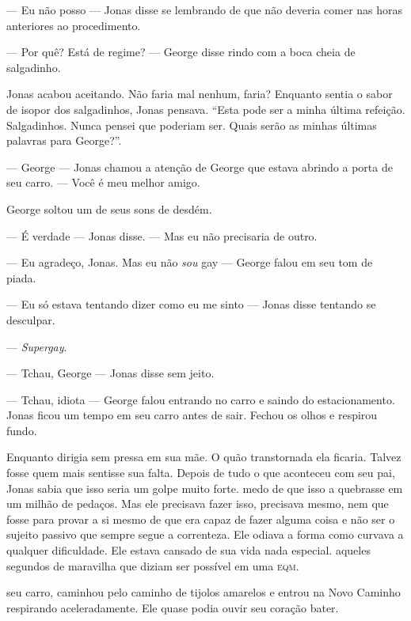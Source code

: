 --- Eu não posso --- Jonas disse\mudanca{,} se lembrando de que não deveria comer nas horas anteriores ao procedimento.

--- Por quê? Está de regime? --- George disse\mudanca{,} rindo\mudanca{,} com a boca cheia de salgadinho.

Jonas acabou aceitando. Não faria mal nenhum, faria? Enquanto sentia o sabor de isopor dos salgadinhos, Jonas pensava. ``Esta pode ser a minha última refeição. Salgadinhos. Nunca pensei que poderiam ser. Quais serão as minhas últimas palavras para George?''.

--- George --- Jonas chamou a atenção de George\mudanca{,} que estava abrindo a porta de seu carro. --- Você é meu melhor amigo.

George soltou um de seus sons de desdém.


--- É verdade --- Jonas disse. --- Mas eu não precisaria de outro.

--- Eu agradeço, Jonas. Mas eu não \emph{sou} gay --- George falou\mudanca{,} em seu tom de piada.

--- Eu só estava tentando dizer como eu me sinto --- Jonas disse\mudanca{,} tentando se desculpar.

--- \emph{Supergay}.

--- Tchau, George --- Jonas disse\mudanca{,} sem jeito.

--- Tchau, idiota --- George falou entrando no carro e saindo do estacionamento. Jonas ficou um tempo em seu carro antes de sair. Fechou os olhos e respirou fundo.

Enquanto dirigia\mudanca{,} sem pressa em sua mãe. O quão transtornada ela ficaria. Talvez fosse quem mais sentisse sua falta. Depois de tudo o que aconteceu com seu pai, Jonas sabia que isso seria um golpe muito forte.  medo de que isso a quebrasse em um milhão de pedaços. Mas ele precisava fazer isso, precisava mesmo, nem que fosse para provar a si mesmo de que era capaz de fazer alguma coisa e não ser o sujeito passivo que sempre segue a correnteza. Ele odiava a forma como  curvava a qualquer dificuldade. Ele estava cansado de sua vida nada especial.  aqueles segundos de maravilha que diziam ser possível em uma \textsc{eqm}.

 seu carro, caminhou pelo caminho de tijolos amarelos e entrou na Novo Caminho respirando aceleradamente. Ele quase podia ouvir seu coração bater.

